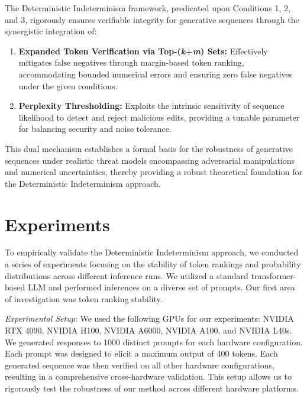 \documentclass{article}
\begin{document}
The Deterministic Indeterminism framework, predicated upon Conditions 1, 2, and 3, rigorously ensures verifiable integrity for generative sequences through the synergistic integration of:
\begin{enumerate}
    \item \textbf{Expanded Token Verification via Top-(\textit{k}+\textit{m}) Sets:} Effectively mitigates false negatives through margin-based token ranking, accommodating bounded numerical errors and ensuring zero false negatives under the given conditions.
    \item \textbf{Perplexity Thresholding:} Exploits the intrinsic sensitivity of sequence likelihood to detect and reject malicious edits, providing a tunable parameter for balancing security and noise tolerance.
\end{enumerate}
This dual mechanism establishes a formal basis for the robustness of generative sequences under realistic threat models encompassing adversarial manipulations and numerical uncertainties, thereby providing a robust theoretical foundation for the Deterministic Indeterminism approach.




\section{Experiments}

To empirically validate the Deterministic Indeterminism approach, we conducted a series of experiments focusing on the stability of token rankings and probability distributions across different inference runs. We utilized a standard transformer-based LLM and performed inferences on a diverse set of prompts.  Our first area of investigation was token ranking stability.

\textit{Experimental Setup}:  We used the following GPUs for our experiments: NVIDIA RTX 4090, NVIDIA H100, NVIDIA A6000, NVIDIA A100, and NVIDIA L40s.  We generated responses to 1000 distinct prompts for each hardware configuration.  Each prompt was designed to elicit a maximum output of 400 tokens.  Each generated sequence was then verified on all other hardware configurations, resulting in a comprehensive cross-hardware validation.  This setup allows us to rigorously test the robustness of our method across different hardware platforms.
\end{document}
